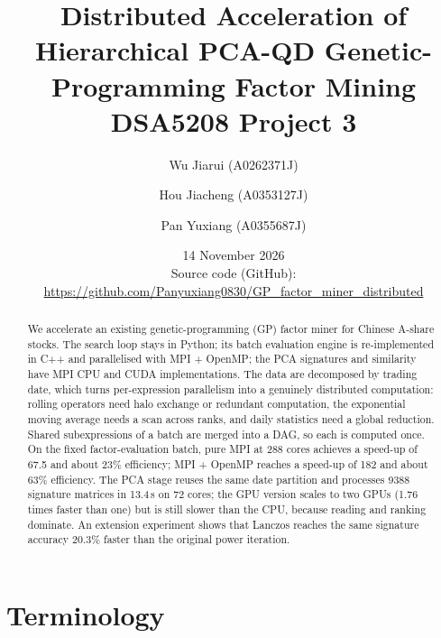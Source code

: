 \documentclass[11pt,a4paper]{article}
\title{Distributed Acceleration of Hierarchical PCA-QD Genetic-Programming Factor Mining\\[4pt]
\large DSA5208 Project 3}
\author{Wu Jiarui (A0262371J) \and Hou Jiacheng (A0353127J) \and Pan Yuxiang (A0355687J)}
\date{14 November 2026\\[6pt]\normalsize Source code (GitHub): \url{https://github.com/Panyuxiang0830/GP_factor_miner_distributed}}
\begin{document}
\maketitle

\begin{abstract}
We accelerate an existing genetic-programming (GP) factor miner for Chinese A-share stocks. The search loop stays in Python; its batch evaluation engine is re-implemented in C++ and parallelised with MPI + OpenMP; the PCA signatures and similarity have MPI CPU and CUDA implementations. The data are decomposed by trading date, which turns per-expression parallelism into a genuinely distributed computation: rolling operators need halo exchange or redundant computation, the exponential moving average needs a scan across ranks, and daily statistics need a global reduction. Shared subexpressions of a batch are merged into a DAG, so each is computed once.
On the fixed factor-evaluation batch, pure MPI at 288 cores achieves a speed-up of 67.5 and about 23\% efficiency; MPI + OpenMP reaches a speed-up of 182 and about 63\% efficiency. The PCA stage reuses the same date partition and processes 9388 signature matrices in 13.4\,s on 72 cores; the GPU version scales to two GPUs (1.76 times faster than one) but is still slower than the CPU, because reading and ranking dominate. An extension experiment shows that Lanczos reaches the same signature accuracy 20.3\% faster than the original power iteration.
\end{abstract}

\section*{Terminology}
\end{document}

